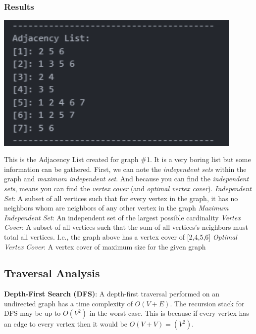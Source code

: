\documentclass[12pt, letterpaper]{article}
\begin{document}
\subsubsection{Results}
\begin{center}
   \includegraphics[width=120mm, scale=0.5]{Images/Graph1_AdjList.png}
\end{center}
This is the Adjacency List created for graph \#1.
It is a very boring list but some information can be gathered.
First, we can note the \textit{independent sets} within the graph and \textit{maximum independent set}.
And because you can find the \textit{independent sets}, means you can find the \textit{vertex cover} (and \textit{optimal vertex cover}).
\vspace*{5px}
\newline
\textit{Independent Set}: A subset of all vertices such that for every vertex in the graph, it has no neighbors whom are neighbors of any other vertex in the graph
\vspace*{5px}
\newline
\textit{Maximum Independent Set}: An independent set of the largest possible cardinality
\vspace*{5px}
\newline
\textit{Vertex Cover}: A subset of all vertices such that the sum of all vertices's neighbors must total all vertices.
I.e., the graph above has a vertex cover of [2,4,5,6] 
\vspace*{5px}
\newline
\textit{Optimal Vertex Cover}: A vertex cover of maximum size for the given graph

\subsection{Traversal Analysis} \label{Traversals}
\textbf{Depth-First Search (DFS)}:
\newline
A depth-first traversal performed on an undirected graph has a time complexity of $O(V + E)$.
The recursion stack for DFS may be up to $O(V^2)$ in the worst case.
This is because if every vertex has an edge to every vertex then it would be $O(V + V) = (V^2)$.
\end{document}
